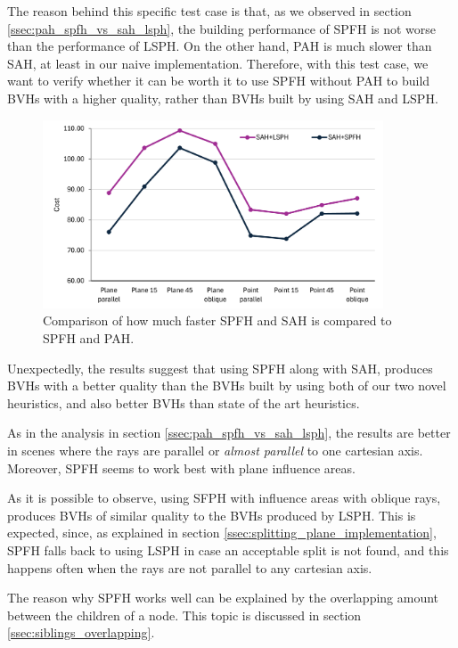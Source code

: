 \documentclass{PoliMi_MasterThesis}
\begin{document}
The reason behind this specific test case is that, as we observed in section \ref{ssec:pah_spfh_vs_sah_lsph}, the building performance of SPFH is not worse than the performance of LSPH. On the other hand, PAH is much slower than SAH, at least in our naive implementation. Therefore, with this test case, we want to verify whether it can be worth it to use SPFH without PAH to build BVHs with a higher quality, rather than BVHs built by using SAH and LSPH.

\begin{figure}[H]
	\centering
	\includegraphics[width=0.9\textwidth]{Images/spfh_isolation.png}
	\caption{Comparison of how much faster SPFH and SAH is compared to SPFH and PAH.}
	\label{fig:spfh_isolation}
\end{figure}

Unexpectedly, the results suggest that using SPFH along with SAH, produces BVHs with a better quality than the BVHs built by using both of our two novel heuristics, and also better BVHs than state of the art heuristics.

As in the analysis in section \ref{ssec:pah_spfh_vs_sah_lsph}, the results are better in scenes where the rays are parallel or \textit{almost parallel} to one cartesian axis. Moreover, SPFH seems to work best with plane influence areas.

As it is possible to observe, using SFPH with influence areas with oblique rays, produces BVHs of similar quality to the BVHs produced by LSPH. This is expected, since, as explained in section \ref{ssec:splitting_plane_implementation}, SPFH falls back to using LSPH in case an acceptable split is not found, and this happens often when the rays are not parallel to any cartesian axis.

The reason why SPFH works well can be explained by the overlapping amount between the children of a node. This topic is discussed in section \ref{ssec:siblings_overlapping}.
\end{document}

